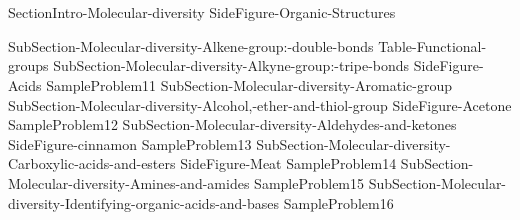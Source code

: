 \documentclass[main.tex]{subfiles}
\begin{document}
\section{\color{blue!30!black}{Molecular diversity}}
 {SectionIntro-Molecular-diversity}\sloppy
{SideFigure-Organic-Structures}
\begin{description}
{SubSection-Molecular-diversity-Alkene-group:-double-bonds}
{Table-Functional-groups}
{SubSection-Molecular-diversity-Alkyne-group:-tripe-bonds}
{SideFigure-Acids}
{SampleProblem11}
 {SubSection-Molecular-diversity-Aromatic-group}
{SubSection-Molecular-diversity-Alcohol,-ether-and-thiol-group}
{SideFigure-Acetone}
{SampleProblem12}
 {SubSection-Molecular-diversity-Aldehydes-and-ketones}
{SideFigure-cinnamon}
{SampleProblem13}
{SubSection-Molecular-diversity-Carboxylic-acids-and-esters}
{SideFigure-Meat}
{SampleProblem14}
{SubSection-Molecular-diversity-Amines-and-amides}
{SampleProblem15}
{SubSection-Molecular-diversity-Identifying-organic-acids-and-bases}
{SampleProblem16}

 \end{description}



\clearpage\thispagestyle{empty}\mbox{}\clearpage
\end{document}
